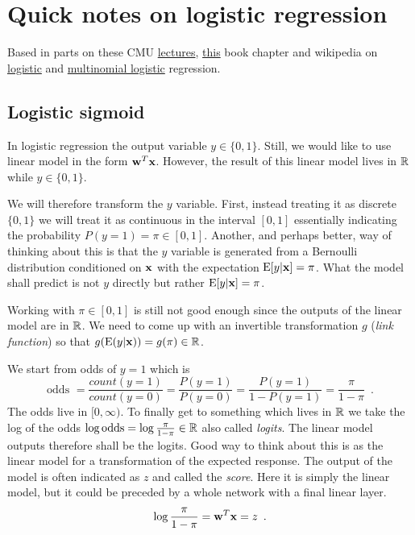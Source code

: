 
\clearpage

\section{Quick notes on logistic regression}

Based in parts on these CMU \href{https://www.stat.cmu.edu/~cshalizi/uADA/12/lectures/ch12.pdf}{lectures}, \href{https://www.sagepub.com/sites/default/files/upm-binaries/21121_Chapter_15.pdf}{this} book chapter and wikipedia on \href{https://en.wikipedia.org/wiki/Logistic_regression}{logistic} and \href{https://en.wikipedia.org/wiki/Multinomial_logistic_regression}{multinomial logistic} regression.


\subsection{Logistic sigmoid}

In logistic regression the output variable $y \in \{0, 1\}$.
Still, we would like to use linear model in the form $\mathbf{w}^T \mathbf{x}$. 
However, the result of this linear model lives in $\mathbb{R}$ while $y \in \{0, 1\}$.


We will therefore transform the $y$ variable.
First, instead treating it as discrete $\{0, 1\}$ we will treat it as continuous
in the interval $[0, 1]$ essentially indicating the probability $P(y=1) = \pi \in [0,1]$.
Another, and perhaps better, way of thinking about this is that the $y$ variable is generated from a Bernoulli distribution conditioned on $\mathbf{x}$ with the expectation $\mathrm{E}[y | \mathbf{x}] = \pi$. What the model shall predict is not $y$ directly but rather $\mathrm{E}[y | \mathbf{x}] = \pi$.


Working with $\pi \in [0,1]$ is still not good enough since the outputs of the linear model are in $\mathbb{R}$. We need to come up with an invertible transformation $g$ (\emph{link function}) so that $g(\mathrm{E}(y | \mathbf{x})) = g(\pi) \in \mathbb{R}$.

We start from odds of $y=1$ which is 
$$ \text{odds } = \frac{count(y=1)}{count(y=0)} = \frac{P(y=1)}{P(y=0)} = \frac{P(y=1)}{1- P(y=1)} = \frac{\pi}{1-\pi} \enspace .$$
The odds live in $[0, \infty)$.
To finally get to something which lives in $\mathbb{R}$ we take the log of the odds $\log \text{odds} = \log \frac{\pi}{1-\pi} \in \mathbb{R}$ also called \emph{logits}.
The linear model outputs therefore shall be the logits.
Good way to think about this is as the linear model for a transformation of the expected response. The output of the model is often indicated as $z$ and called the \emph{score}. Here it is simply the linear model, but it could be preceded by a whole network with a final linear layer.
\begin{equation}
\log \frac{\pi}{1-\pi} = \mathbf{w}^T \mathbf{x} = z \enspace .
\end{equation}

